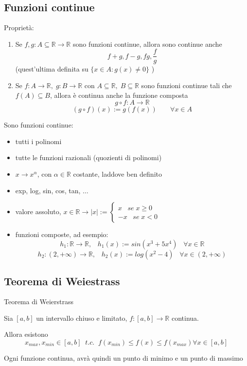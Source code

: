 \documentclass[a4paper]{article}
\theoremstyle{break}
\theoremstyle{break}
\theoremstyle{break}
\theoremstyle{break}
\begin{document}
\subsection{Funzioni continue}

Proprietà:
\begin{enumerate}
    \item Se \( f,g: A \subseteq \mathbb{R} \to  \mathbb{R} \) sono funzioni continue, allora sono continue anche
        \[
        f+g, f-g, fg, \frac{f}{g}
        \] 
        (quest'ultima definita su \( \{x \in A: g(x) \neq 0\}  \) )
    \item Se \( f: A \to \mathbb{R},\;g: B \to \mathbb{R} \) con \( A \subseteq \mathbb{R},\; B \subseteq \mathbb{R} \) 
        sono funzioni continue tali che \( f(A) \subseteq B \), allora è continua anche la funzione composta
        \[
            g \circ f: A \to \mathbb{R}
        \] 
        \[
        (g \circ f)(x) := g(f(x))\;\;\;\;\;\;\; \forall x \in A
        \] 
\end{enumerate}
\begin{example}
    Sono funzioni continue:
    \begin{itemize}
        \item tutti i polinomi
        \item tutte le funzioni razionali (quozienti di polinomi)
        \item \( x \to x^\alpha \), con \( \alpha \in \mathbb{R} \) costante, laddove ben definito 
        \item exp, log, sin, cos, tan, \( \ldots \) 
        \item valore assoluto, \( x \in \mathbb{R} \to |x|:= \begin{cases}
            x\;\;\; se\; x \ge 0 \\
            -x\;\;\; se\; x < 0
        \end{cases} \) 
        \item funzioni composte, ad esempio:
            \[
            h_1: \mathbb{R} \to \mathbb{R},\;\;\; h_1(x):=sin(x^3 + 5x^4)\;\;\; \forall x \in \mathbb{R}
            \] 
            \[
            h_2:(2, +\infty) \to \mathbb{R}, \;\;\; h_2(x):=log(x^2-4)\;\;\; \forall x \in (2, +\infty) 
            \] 
    \end{itemize}
\end{example}

\subsection{Teorema di Weiestrass}
\begin{definition}
    Teorema di Weierstrass

    Sia \( [a, b] \) un intervallo chiuso e limitato, \( f: [a,b]  \to \mathbb{R}\) continua.

    Allora esistono
    \[
        x_{max}, x_{min} \in [a,b]\;\; t.c.\;\; f(x_{min}) \le f(x) \le f(x_{max}) \forall x \in [a,b]
    \] 

    \label{D1}

    Ogni funzione continua, avrà quindi un punto di minimo e un punto di massimo
\end{definition}
\end{document}
